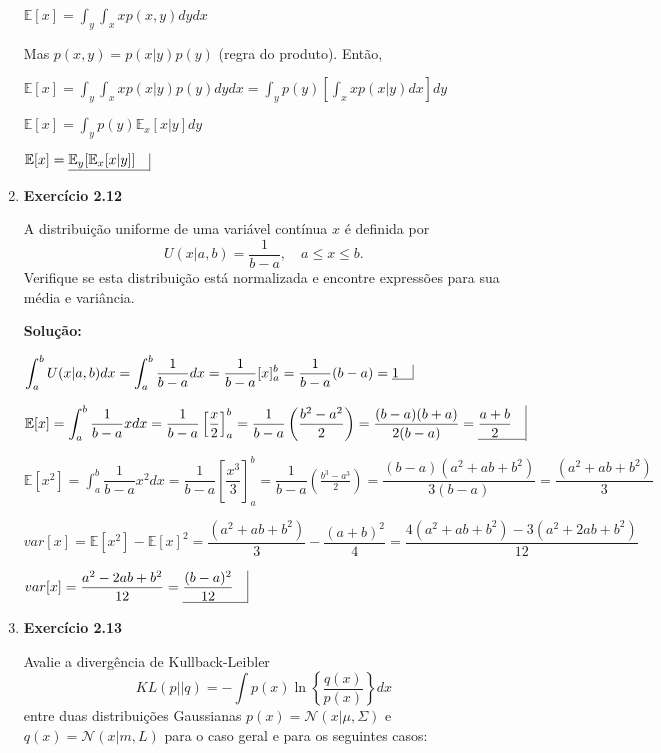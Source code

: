 \begin{enumerate}
$ \mathbb{E}[x] = \int_y \int_x x p(x,y) dy dx $

Mas $ p(x,y) = p(x|y) p(y)$ (regra do produto). Então,

$ \mathbb{E}[x] = \int_y \int_x x p(x|y) p(y) dy dx = \int_y p(y) \left[ \int_x x p(x|y) dx \right]  dy $

$ \mathbb{E}[x] =\int_y p(y) \mathbb{E}_x[x|y] dy $

$ \mathbb{E}[x] = \underline{ \mathbb{E}_y [ \mathbb{E}_x[x|y] ] \quad} \vline $




\item \textbf{Exercício 2.12} \par
A distribuição uniforme de uma variável contínua $x$ é definida por
\begin{equation*}
    U(x|a,b) = \dfrac{1}{b-a}, \quad a\leq x \leq b.
\end{equation*}
Verifique se esta distribuição está normalizada e encontre expressões para sua média e variância.
\par
\textbf{Solução:}


$ \displaystyle  \int_a^b U(x|a,b) dx = \int_a^b \dfrac{1}{b-a} dx = \dfrac{1}{b-a} [x]_a^b = \dfrac{1}{b-a} (b-a) = \underline{ 1 \quad} \rule[-0.4ex]{0.4pt}{2.5ex} $

$ \mathbb{E}[x] = \displaystyle \int_a^b \dfrac{1}{b-a} x dx = \dfrac{1}{b-a} \left[\dfrac{x}{2}\right]_a^b = \dfrac{1}{b-a} \left(\frac{b^2-a^2}{2}\right) = \dfrac{(b-a)(b+a)}{2(b-a)} = \underline{ \dfrac{a+b}{2} \quad} \vline $

$ \mathbb{E}[x^2] = \displaystyle \int_a^b \dfrac{1}{b-a} x^2 dx = \dfrac{1}{b-a} \left[\dfrac{x^3}{3}\right]_a^b = \dfrac{1}{b-a} \left(\frac{b^3-a^3}{2}\right) = \dfrac{(b-a)(a^2+ab+b^2)}{3(b-a)} = \dfrac{(a^2+ab+b^2)}{3} $

$var[x] = \mathbb{E}[x^2] - \mathbb{E}[x]^2 = \dfrac{(a^2+ab+b^2)}{3} - \dfrac{(a+b)^2}{4} = \dfrac{4(a^2+ab+b^2) - 3 (a^2+2ab+b^2)}{12} $

$var[x] = \dfrac{a^2-2ab+b^2}{12} = \underline{ \dfrac{(b-a)^2}{12} \quad} \vline $





\item \textbf{Exercício 2.13} \par
Avalie a divergência de Kullback-Leibler 
\begin{equation*}
    KL(p || q) = - \int p(x) \ln \left\{ \frac{q(x)}{p(x)} \right\} dx
\end{equation*}
 entre duas distribuições Gaussianas $p(x) = \mathcal{N}(x|\mu, \Sigma)$ e $q(x) = \mathcal{N}(x|m, L)$ para o caso geral e para os seguintes casos:


\end{enumerate}
